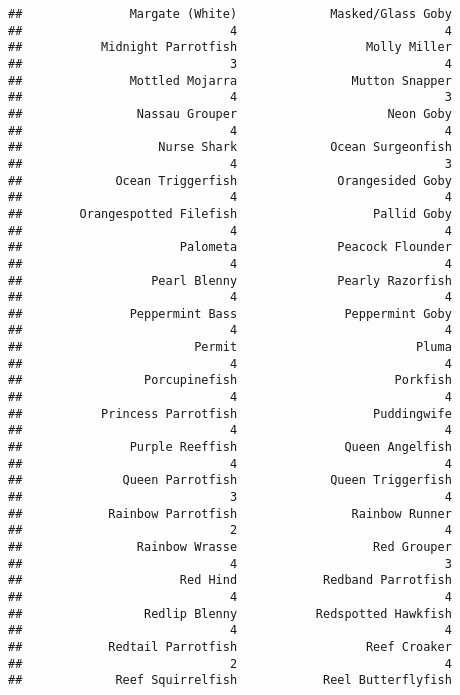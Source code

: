 \documentclass[
]{article}
\begin{document}
\begin{verbatim}
##               Margate (White)             Masked/Glass Goby 
##                             4                             4 
##           Midnight Parrotfish                  Molly Miller 
##                             3                             4 
##               Mottled Mojarra                Mutton Snapper 
##                             4                             3 
##                Nassau Grouper                     Neon Goby 
##                             4                             4 
##                   Nurse Shark             Ocean Surgeonfish 
##                             4                             3 
##             Ocean Triggerfish              Orangesided Goby 
##                             4                             4 
##        Orangespotted Filefish                   Pallid Goby 
##                             4                             4 
##                      Palometa              Peacock Flounder 
##                             4                             4 
##                  Pearl Blenny              Pearly Razorfish 
##                             4                             4 
##               Peppermint Bass               Peppermint Goby 
##                             4                             4 
##                        Permit                         Pluma 
##                             4                             4 
##                 Porcupinefish                      Porkfish 
##                             4                             4 
##           Princess Parrotfish                   Puddingwife 
##                             4                             4 
##               Purple Reeffish               Queen Angelfish 
##                             4                             4 
##              Queen Parrotfish             Queen Triggerfish 
##                             3                             4 
##            Rainbow Parrotfish                Rainbow Runner 
##                             2                             4 
##                Rainbow Wrasse                   Red Grouper 
##                             4                             3 
##                      Red Hind            Redband Parrotfish 
##                             4                             4 
##                 Redlip Blenny           Redspotted Hawkfish 
##                             4                             4 
##            Redtail Parrotfish                  Reef Croaker 
##                             2                             4 
##             Reef Squirrelfish            Reel Butterflyfish 

\end{verbatim}
\end{document}
